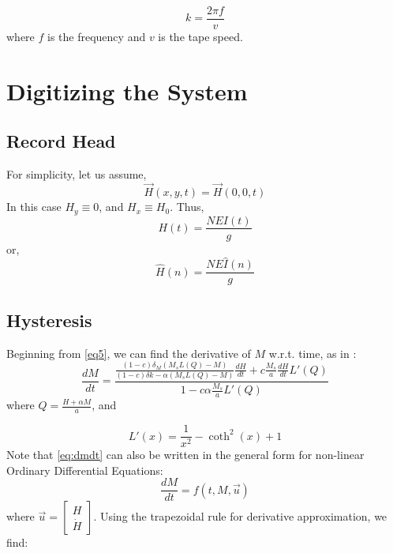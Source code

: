 \documentclass[twoside,a4paper]{article}
\begin{document}
\begin{equation}
    k = \frac {2 \pi f}{v}
    \label{eq:wavenumber}
\end{equation}
%
where $f$ is the frequency and $v$ is the tape speed.

\section{Digitizing the System}
\subsection{Record Head}
For simplicity, let us assume,
\begin{equation}
    \vec{H}(x,y,t) = \vec{H}(0,0,t)
    \label{eq:spatialApprox}
\end{equation}
%
In this case $H_y \equiv 0$, and $H_x \equiv H_0$. Thus,
\begin{equation}
    H(t) = \frac{NEI(t)}{g}
    \label{eq15}
\end{equation}
%
or,
\begin{equation}
    \hat{H}(n) = \frac{NE\hat{I}(n)}{g}
    \label{eq:Hin}
\end{equation}

\subsection{Hysteresis}
Beginning from \cref{eq5}, we can find the derivative of $M$ w.r.t. time,
as in \cite{Hysteresis}:
\begin{equation}
    \frac{dM}{dt} = \frac{\frac{(1-c) \delta_M (M_sL(Q) - M)}{(1-c) \delta k - \alpha (M_sL(Q) - M)} \frac{dH}{dt} + c \frac{M_s}{a} \frac{dH}{dt} L'(Q)}{1 - c \alpha \frac{M_s}{a} L'(Q)}
    \label{eq:dmdt}
\end{equation}
%
where $Q = \frac{H + \alpha M}{a}$, and

\begin{equation}
    L'(x) = \frac{1}{x^2} - \coth^2(x) + 1
\end{equation}
%
Note that \cref{eq:dmdt} can also be written in the general form for non-linear
Ordinary Differential Equations:
\begin{equation}
    \frac{dM}{dt} = f(t,M,\vec{u})
\end{equation}
where $\vec{u} = \begin{bmatrix}
    H \\
    \dot{H}
    \end{bmatrix}$.
\newline\newline
Using the trapezoidal rule for derivative approximation, we find:
\end{document}
